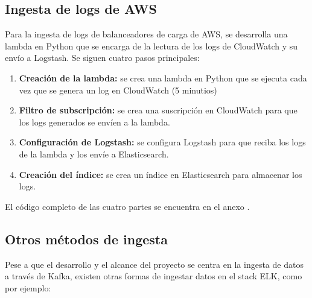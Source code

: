\newpage{}
\subsection{Ingesta de logs de AWS}\label{subsec:impl_ingesta_aws}
Para la ingesta de logs de balanceadores de carga de AWS, se desarrolla una
lambda en Python que se encarga de la lectura de los logs de CloudWatch y su
envío a Logstash. Se siguen cuatro pasos principales:

\begin{enumerate}
	\item \textbf{Creación de la lambda:} se crea una lambda en Python que se
		ejecuta cada vez que se genera un log en CloudWatch (5 minutios)
	\item \textbf{Filtro de subscripción:} se crea una suscripción en CloudWatch
		para que los logs generados se envíen a la lambda.
	\item \textbf{Configuración de Logstash:} se configura Logstash para que
		reciba los logs de la lambda y los envíe a Elasticsearch.
	\item \textbf{Creación del índice:} se crea un índice en Elasticsearch para
		almacenar los logs.
\end{enumerate}

El código completo de las cuatro partes se encuentra en el anexo .


\newpage{}
\subsection{Otros métodos de ingesta}\label{subsec:impl_ingesta_otros}
Pese a que el desarrollo y el alcance del proyecto se centra en la ingesta de
datos a través de Kafka, existen otras formas de ingestar datos en el stack
ELK, como por ejemplo:

